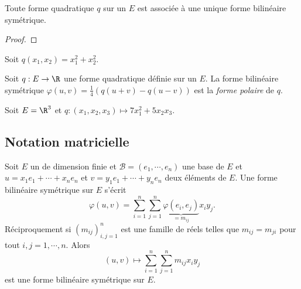 \begin{exemple}
	\pl{\rep{3cm}} %
\end{exemple}

\sld{\vfill\pagebreak[5]}%


\begin{proposition}
	Toute forme quadratique $q$ sur un \rev{} $E$ est associée à une unique forme bilinéaire symétrique.
\end{proposition}

\begin{proof}
		\pl{\rep{10cm}}
\end{proof}
\pl{\pagebreak[5]}
\begin{exemple}
Soit $q(x_1,x_2) = x_1^2 +x_2^2$.

\pl{\rep{6cm}} %
\end{exemple}
\begin{definition}
	Soit $q:E\to\R$ une forme quadratique définie sur un \rev{} $E$. La forme bilinéaire symétrique $\varphi(u,v) = \frac{1}{4} \left( q(u+v) - q(u-v) \right)$ est la \emph{forme polaire} de $q$.
\end{definition}
\begin{exemple}
Soit $E=\R^3$ et  $q:(x_1,x_2,x_3) \mapsto 7x_1^2 +5  x_2 x_3$.

\pl{\rep{9cm}} %
\end{exemple}

\sld{\vfill\pagebreak[5]}%

\subsection{Notation matricielle}

	Soit $E$ un \rev{} de dimension finie et $\mathcal B = (e_1,\cdots,e_n)$ une base de $E$ et $u=x_1 e_1 + \cdots+ x_n e_n$ et $v=y_1e_1+\cdots+y_n e_n$ deux éléments de $E$. Une forme bilinéaire symétrique sur $E$ s'écrit
	\[
		\varphi (u,v) = \sum_{i=1}^n \sum_{j=1}^n \underbrace{\varphi(e_i,e_j)}_{=m_{ij}} x_iy_j.
	\]
	Réciproquement si $(m_{ij})_{i,j=1}^n$ est une famille de réels telles que $m_{ij} = m_{ji}$ pour tout $i,j=1,\cdots,n$. Alors 
	\[
		(u,v) \mapsto \sum_{i=1}^n \sum_{j=1}^n m_{ij} x_i y_j
	\]
	est une forme bilinéaire symétrique sur $E$.

\sld{\vfill\pagebreak[5]}%


